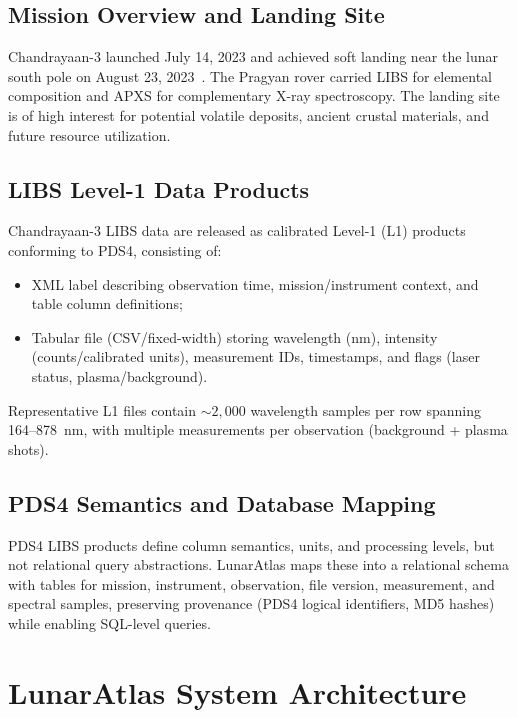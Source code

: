 \documentclass[11pt,a4paper]{article}
\begin{document}
\subsection{Mission Overview and Landing Site}

Chandrayaan-3 launched July 14, 2023 and achieved soft landing near the lunar south pole on August 23, 2023~\cite{ISROCh3}. The Pragyan rover carried LIBS for elemental composition and APXS for complementary X-ray spectroscopy. The landing site is of high interest for potential volatile deposits, ancient crustal materials, and future resource utilization.

\subsection{LIBS Level-1 Data Products}

Chandrayaan-3 LIBS data are released as calibrated Level-1 (L1) products conforming to PDS4, consisting of:

\begin{itemize}[nosep]
\item XML label describing observation time, mission/instrument context, and table column definitions;
\item Tabular file (CSV/fixed-width) storing wavelength (\si{nm}), intensity (counts/calibrated units), measurement IDs, timestamps, and flags (laser status, plasma/background).
\end{itemize}

Representative L1 files contain $\sim 2{,}000$ wavelength samples per row spanning 164--878~nm, with multiple measurements per observation (background + plasma shots).

\subsection{PDS4 Semantics and Database Mapping}

PDS4 LIBS products define column semantics, units, and processing levels, but not relational query abstractions. LunarAtlas maps these into a relational schema with tables for mission, instrument, observation, file version, measurement, and spectral samples, preserving provenance (PDS4 logical identifiers, MD5 hashes) while enabling SQL-level queries.

\section{LunarAtlas System Architecture}
\label{sec:architecture}
\end{document}
